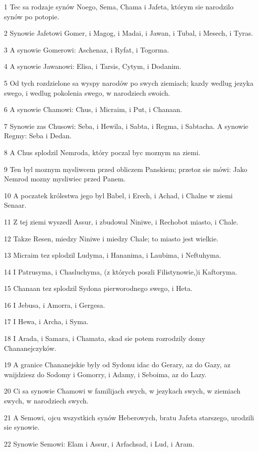 \par 1 Tec sa rodzaje synów Noego, Sema, Chama i Jafeta, którym sie narodzilo synów po potopie.
\par 2 Synowie Jafetowi Gomer, i Magog, i Madai, i Jawan, i Tubal, i Mesech, i Tyras.
\par 3 A synowie Gomerowi: Aschenaz, i Ryfat, i Togorma.
\par 4 A synowie Jawanowi: Elisa, i Tarsis, Cytym, i Dodanim.
\par 5 Od tych rozdzielone sa wyspy narodów po swych ziemiach; kazdy wedlug jezyka swego, i wedlug pokolenia swego, w narodziech swoich.
\par 6 A synowie Chamowi: Chus, i Micraim, i Put, i Chanaan.
\par 7 Synowie zas Chusowi: Seba, i Hewila, i Sabta, i Regma, i Sabtacha. A synowie Regmy: Seba i Dedan.
\par 8 A Chus splodzil Nemroda, który poczal byc moznym na ziemi.
\par 9 Ten byl moznym mysliwcem przed obliczem Panskiem; przetoz sie mówi: Jako Nemrod mozny mysliwiec przed Panem.
\par 10 A poczatek królestwa jego byl Babel, i Erech, i Achad, i Chalne w ziemi Senaar.
\par 11 Z tej ziemi wyszedl Assur, i zbudowal Niniwe, i Rechobot miasto, i Chale.
\par 12 Takze Resen, miedzy Niniwe i miedzy Chale; to miasto jest wielkie.
\par 13 Micraim tez splodzil Ludyma, i Hananima, i Laubima, i Neftuhyma.
\par 14 I Patrusyma, i Chasluchyma, (z których poszli Filistynowie,)i Kaftoryma.
\par 15 Chanaan tez splodzil Sydona pierworodnego swego, i Heta.
\par 16 I Jebusa, i Amorra, i Gergesa.
\par 17 I Hewa, i Archa, i Syma.
\par 18 I Arada, i Samara, i Chamata, skad sie potem rozrodzily domy Chananejczyków.
\par 19 A granice Chananejskie byly od Sydonu idac do Gerary, az do Gazy, az wnijdziesz do Sodomy i Gomorry, i Adamy, i Seboima, az do Lazy.
\par 20 Ci sa synowie Chamowi w familijach swych, w jezykach swych, w ziemiach swych, w narodziech swych.
\par 21 A Semowi, ojcu wszystkich synów Heberowych, bratu Jafeta starszego, urodzili sie synowie.
\par 22 Synowie Semowi: Elam i Assur, i Arfachsad, i Lud, i Aram.

